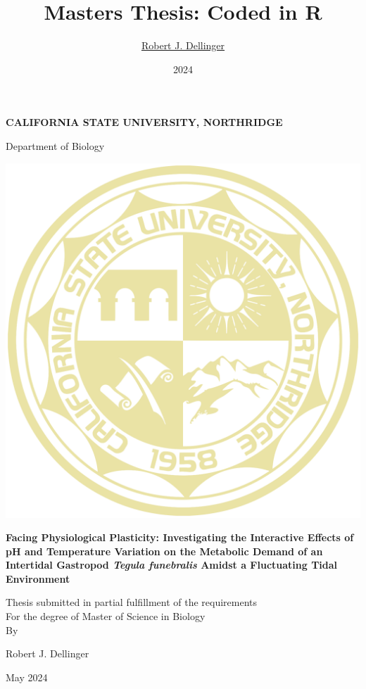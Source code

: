 \documentclass[
  12pt,
]{article}
\title{Masters Thesis: Coded in R}
\author{\href{https://robdellinger.com}{Robert J. Dellinger}}
\date{2024}
\begin{document}
\maketitle

\newpage
\pagestyle{empty}

\allsectionsfont{\centering}
\subsectionfont{\raggedright}
\subsubsectionfont{\raggedright}

\begin{centering}

\vspace{1 in}
{\bf CALIFORNIA STATE UNIVERSITY, NORTHRIDGE}

\vspace{0.1 in}
{Department of Biology}
\vspace{0.2 in}



\includegraphics[width=0.3\linewidth]{Images/university_logo} 


\vspace{0.1 in}

\doublespacing
{\bf Facing Physiological Plasticity: Investigating the Interactive Effects of pH and Temperature Variation on the Metabolic Demand of an Intertidal Gastropod \emph{Tegula funebralis} Amidst a Fluctuating Tidal Environment \\}

\vspace{0.3 in}

Thesis submitted in partial fulfillment of the requirements\\
For the degree of Master of Science in Biology \\

\vspace{0.4 in}
\singlespacing
By

\vspace{0.1 in}
{Robert J. Dellinger}

\vspace{2 in}
May 2024

\end{centering}
\doublespacing

\newpage
\pagestyle{plain}
\end{document}

